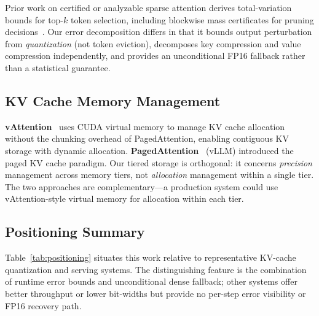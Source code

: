 \documentclass[10pt,twocolumn,a4paper]{article}
\theoremstyle{definition}
\theoremstyle{remark}
\begin{document}
Prior work on certified or analyzable sparse attention derives total-variation bounds for top-$k$ token selection, including blockwise mass certificates for pruning decisions~\cite{certifiedtopk}.  Our error decomposition differs in that it bounds output perturbation from \emph{quantization} (not token eviction), decomposes key compression and value compression independently, and provides an unconditional FP16 fallback rather than a statistical guarantee.

\subsection{KV Cache Memory Management}

\textbf{vAttention}~\cite{vattention} uses CUDA virtual memory to manage KV cache allocation without the chunking overhead of PagedAttention, enabling contiguous KV storage with dynamic allocation.  \textbf{PagedAttention}~\cite{pagedattn} (vLLM) introduced the paged KV cache paradigm.  Our tiered storage is orthogonal: it concerns \emph{precision} management across memory tiers, not \emph{allocation} management within a single tier.  The two approaches are complementary---a production system could use vAttention-style virtual memory for allocation within each tier.

\subsection{Positioning Summary}

Table~\ref{tab:positioning} situates this work relative to representative KV-cache quantization and serving systems.  The distinguishing feature is the combination of runtime error bounds and unconditional dense fallback; other systems offer better throughput or lower bit-widths but provide no per-step error visibility or FP16 recovery path.
\end{document}
